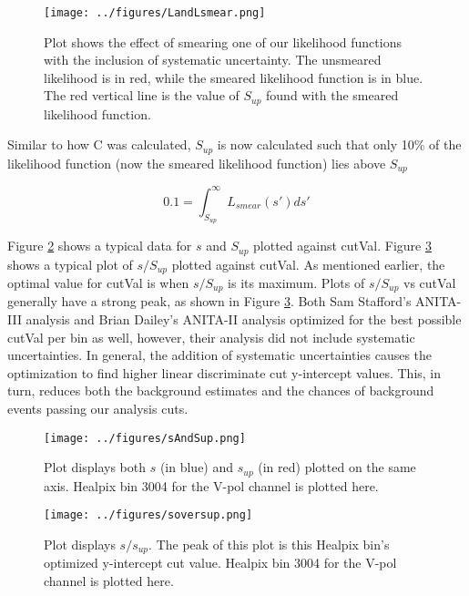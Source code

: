 \begin{figure}[h]
\centering
\texttt{[image: ../figures/LandLsmear.png]}
\caption[Example Likelihood and Smeared Likelihood Functions]{Plot shows the effect of smearing one of our likelihood functions with the inclusion of systematic uncertainty.  The unsmeared likelihood is in red, while the smeared likelihood function is in blue. The red vertical line is the value of $S_{up}$ found with the smeared likelihood function.}
\label{fig:LandLsmear}
\end{figure}

Similar to how C was calculated, $S_{up}$ is now calculated such that only 10\% of the likelihood function (now the smeared likelihood function) lies above $S_{up}$

\begin{equation} \label{S_up}
0.1    = \int_{S_{up}}^{\infty} L_{smear}(s') ds'
\end{equation}

Figure \ref{fig:sAndSup} shows a typical data for $s$ and $S_{up}$ plotted against cutVal.  Figure \ref{fig:s/sup} shows a typical plot of $s/S_{up}$ plotted against cutVal.  As mentioned earlier, the optimal value for cutVal is when $s/S_{up}$ is its maximum.  Plots of $s/S_{up}$ vs cutVal generally have a strong peak, as shown in Figure \ref{fig:s/sup}.  Both Sam Stafford's ANITA-III analysis and Brian Dailey's ANITA-II analysis optimized for the best possible cutVal per bin as well, however, their analysis did not include systematic uncertainties.  In general, the addition of systematic uncertainties causes the optimization to find higher linear discriminate cut y-intercept values.  This, in turn, reduces both the background estimates and the chances of background events passing our analysis cuts. 

\begin{figure}[h]
\centering
\texttt{[image: ../figures/sAndSup.png]}
\caption[Example plot of $s$ and $s_{up}$]{Plot displays both $s$ (in blue) and $s_{up}$ (in red) plotted on the same axis.  Healpix bin 3004 for the V-pol channel is plotted here.}
\label{fig:sAndSup}
\end{figure}

\begin{figure}[h]
\centering
\texttt{[image: ../figures/soversup.png]}
\caption[Example plot of $s/s_{up}$]{Plot displays $s/s_{up}$.  The peak of this plot is this Healpix bin's optimized y-intercept cut value.  Healpix bin 3004 for the V-pol channel is plotted here.}
\label{fig:s/sup}
\end{figure}

